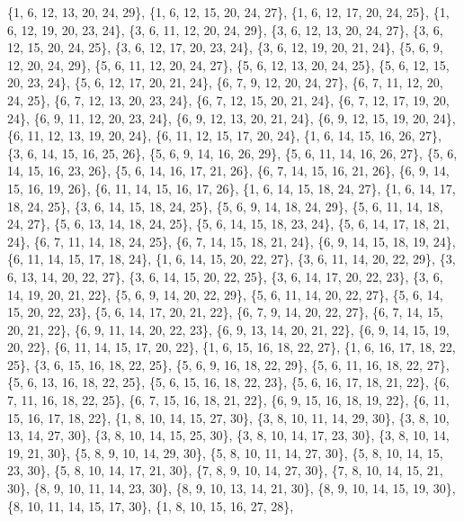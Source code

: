 \documentclass[11pt,a4paper]{article}
\begin{document}
{\{1, 6, 12, 13, 20, 24, 29\}, \{1, 6, 12, 15, 20, 24, 27\}, \{1, 6, 12, 17, 20, 24, 25\}, \{1, 6, 12, 19, 20, 23, 24\}, \{3, 6, 11, 12, 20, 24, 29\},
\{3, 6, 12, 13, 20, 24, 27\}, \{3, 6, 12, 15, 20, 24, 25\}, \{3, 6, 12, 17, 20, 23, 24\}, \{3, 6, 12, 19, 20, 21, 24\}, \{5, 6, 9, 12, 20, 24, 29\},
\{5, 6, 11, 12, 20, 24, 27\}, \{5, 6, 12, 13, 20, 24, 25\}, \{5, 6, 12, 15, 20, 23, 24\}, \{5, 6, 12, 17, 20, 21, 24\}, \{6, 7, 9, 12, 20, 24, 27\},
\{6, 7, 11, 12, 20, 24, 25\}, \{6, 7, 12, 13, 20, 23, 24\}, \{6, 7, 12, 15, 20, 21, 24\}, \{6, 7, 12, 17, 19, 20, 24\}, \{6, 9, 11, 12, 20, 23, 24\},
\{6, 9, 12, 13, 20, 21, 24\}, \{6, 9, 12, 15, 19, 20, 24\}, \{6, 11, 12, 13, 19, 20, 24\}, \{6, 11, 12, 15, 17, 20, 24\}, \{1, 6, 14, 15, 16, 26, 27\},
\{3, 6, 14, 15, 16, 25, 26\}, \{5, 6, 9, 14, 16, 26, 29\}, \{5, 6, 11, 14, 16, 26, 27\}, \{5, 6, 14, 15, 16, 23, 26\}, \{5, 6, 14, 16, 17, 21, 26\},
\{6, 7, 14, 15, 16, 21, 26\}, \{6, 9, 14, 15, 16, 19, 26\}, \{6, 11, 14, 15, 16, 17, 26\}, \{1, 6, 14, 15, 18, 24, 27\}, \{1, 6, 14, 17, 18, 24, 25\},
\{3, 6, 14, 15, 18, 24, 25\}, \{5, 6, 9, 14, 18, 24, 29\}, \{5, 6, 11, 14, 18, 24, 27\}, \{5, 6, 13, 14, 18, 24, 25\}, \{5, 6, 14, 15, 18, 23, 24\},
\{5, 6, 14, 17, 18, 21, 24\}, \{6, 7, 11, 14, 18, 24, 25\}, \{6, 7, 14, 15, 18, 21, 24\}, \{6, 9, 14, 15, 18, 19, 24\}, \{6, 11, 14, 15, 17, 18, 24\},
\{1, 6, 14, 15, 20, 22, 27\}, \{3, 6, 11, 14, 20, 22, 29\}, \{3, 6, 13, 14, 20, 22, 27\}, \{3, 6, 14, 15, 20, 22, 25\}, \{3, 6, 14, 17, 20, 22, 23\},
\{3, 6, 14, 19, 20, 21, 22\}, \{5, 6, 9, 14, 20, 22, 29\}, \{5, 6, 11, 14, 20, 22, 27\}, \{5, 6, 14, 15, 20, 22, 23\}, \{5, 6, 14, 17, 20, 21, 22\},
\{6, 7, 9, 14, 20, 22, 27\}, \{6, 7, 14, 15, 20, 21, 22\}, \{6, 9, 11, 14, 20, 22, 23\}, \{6, 9, 13, 14, 20, 21, 22\}, \{6, 9, 14, 15, 19, 20, 22\},
\{6, 11, 14, 15, 17, 20, 22\}, \{1, 6, 15, 16, 18, 22, 27\}, \{1, 6, 16, 17, 18, 22, 25\}, \{3, 6, 15, 16, 18, 22, 25\}, \{5, 6, 9, 16, 18, 22, 29\},
\{5, 6, 11, 16, 18, 22, 27\}, \{5, 6, 13, 16, 18, 22, 25\}, \{5, 6, 15, 16, 18, 22, 23\}, \{5, 6, 16, 17, 18, 21, 22\}, \{6, 7, 11, 16, 18, 22, 25\},
\{6, 7, 15, 16, 18, 21, 22\}, \{6, 9, 15, 16, 18, 19, 22\}, \{6, 11, 15, 16, 17, 18, 22\}, \{1, 8, 10, 14, 15, 27, 30\}, \{3, 8, 10, 11, 14, 29, 30\},
\{3, 8, 10, 13, 14, 27, 30\}, \{3, 8, 10, 14, 15, 25, 30\}, \{3, 8, 10, 14, 17, 23, 30\}, \{3, 8, 10, 14, 19, 21, 30\}, \{5, 8, 9, 10, 14, 29, 30\},
\{5, 8, 10, 11, 14, 27, 30\}, \{5, 8, 10, 14, 15, 23, 30\}, \{5, 8, 10, 14, 17, 21, 30\}, \{7, 8, 9, 10, 14, 27, 30\}, \{7, 8, 10, 14, 15, 21, 30\},
\{8, 9, 10, 11, 14, 23, 30\}, \{8, 9, 10, 13, 14, 21, 30\}, \{8, 9, 10, 14, 15, 19, 30\}, \{8, 10, 11, 14, 15, 17, 30\}, \{1, 8, 10, 15, 16, 27, 28\},
}
\end{document}
